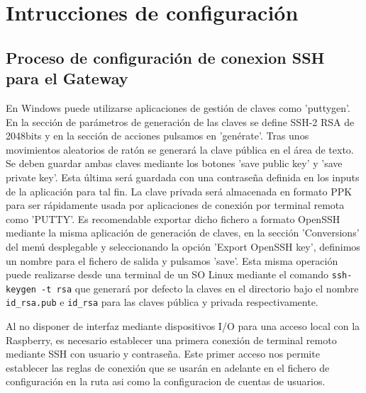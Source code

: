 

\cleardoublepage


\chapter{Intrucciones de configuración}
\label{AppendiA:Key1}

\section{Proceso de configuración de conexion SSH para el Gateway}
\label{AppendiA:Key2}

En Windows puede utilizarse aplicaciones de gestión de claves como 'puttygen'. En la sección de parámetros de generación de las claves se define SSH-2 RSA de 2048bits y en la sección de acciones pulsamos en 'genérate'. Tras unos movimientos aleatorios de ratón se generará la clave pública en el área de texto. Se deben guardar ambas claves mediante los botones 'save public key' y 'save private key'. Esta última será guardada con una contraseña definida en los inputs de la aplicación para tal fin. La clave privada será almacenada en formato PPK para ser rápidamente usada por aplicaciones de conexión por terminal remota como 'PUTTY'. Es recomendable exportar dicho fichero a formato OpenSSH mediante la misma aplicación de generación de claves, en la sección 'Conversions' del menú desplegable y seleccionando la opción 'Export OpenSSH key', definimos un nombre para el fichero de salida y pulsamos 'save'. Esta misma operación puede realizarse desde una terminal de un SO Linux mediante el comando \verb|ssh-keygen -t rsa| que generará por defecto la claves en el directorio  bajo el nombre \verb|id_rsa.pub| e \verb|id_rsa| para las claves pública y privada respectivamente.

\vspace{1cm}

Al no disponer de interfaz mediante dispositivos I/O para una acceso local con la Raspberry, es necesario establecer una primera conexión de terminal remoto mediante SSH con usuario y contraseña. Este primer acceso nos permite establecer las reglas de conexión que se usarán en adelante en el fichero de configuración en la ruta  asi como la configuracion de cuentas de usuarios.

